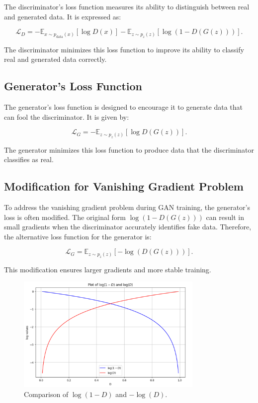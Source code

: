 The discriminator’s loss function measures its ability to distinguish between real and generated data. It is expressed as:

\begin{equation}
    \label{eq:discriminator_loss}
    \mathcal{L}_D = -\mathbb{E}_{x \sim p_{\text{data}}(x)} [\log D(x)] - \mathbb{E}_{z \sim p_z(z)} [\log(1 - D(G(z)))].
\end{equation}

The discriminator minimizes this loss function to improve its ability to classify real and generated data correctly.

\subsection{Generator's Loss Function}

The generator’s loss function is designed to encourage it to generate data that can fool the discriminator. It is given by:

\begin{equation}
    \label{eq:generator_loss}
    \mathcal{L}_G = -\mathbb{E}_{z \sim p_z(z)} [\log D(G(z))].
\end{equation}

The generator minimizes this loss function to produce data that the discriminator classifies as real.

\subsection{Modification for Vanishing Gradient Problem}

To address the vanishing gradient problem during GAN training, the generator’s loss is often modified. The original form \(\log(1 - D(G(z)))\) can result in small gradients when the discriminator accurately identifies fake data. Therefore, the alternative loss function for the generator is:

\begin{equation}
    \label{eq:new_generator_loss}
    \mathcal{L}_G = \mathbb{E}_{z \sim p_z(z)} [-\log(D(G(z)))].
\end{equation}

This modification ensures larger gradients and more stable training.

\begin{figure}[H]
    \centering
    \includegraphics[width=0.8\textwidth]{./Images/log_gunction.jpg}
    \caption{Comparison of $\log(1 - D)$ and $-\log(D)$.}
    \label{fig:log_function}
\end{figure}



